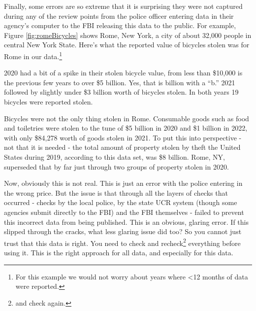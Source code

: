 \documentclass[
]{krantz}
\begin{document}
Finally, some errors are so extreme that it is surprising
they were not captured during any of the review points from
the police officer entering data in their agency's computer
to the FBI releasing this data to the public. For example,
Figure \ref{fig:romeBicycles} shows Rome, New York, a city
of about 32,000 people in central New York State. Here's
what the reported value of bicycles stolen was for Rome in
our data.\footnote{For this example we would not worry about
  years where \textless12 months of data were reported.}

2020 had a bit of a spike in their stolen bicycle value,
from less than \$10,000 is the previous few years to over
\$5 billion. Yes, that is billion with a ``b.'' 2021
followed by slightly under \$3 billion worth of bicycles
stolen. In both years 19 bicycles were reported stolen.

Bicycles were not the only thing stolen in Rome. Consumable
goods such as food and toiletries were stolen to the tune of
\$5 billion in 2020 and \$1 billion in 2022, with only
\$84,278 worth of goods stolen in 2021. To put this into
perspective - not that it is needed - the total amount of
property stolen by theft the United States during 2019,
according to this data set, was \$8 billion. Rome, NY,
superseded that by far just through two groups of property
stolen in 2020.

Now, obviously this is not real. This is just an error with
the police entering in the wrong price. But the issue is
that through all the layers of checks that occurred - checks
by the local police, by the state UCR system (though some
agencies submit directly to the FBI) and the FBI themselves
- failed to prevent this incorrect data from being
published. This is an obvious, glaring error. If this
slipped through the cracks, what less glaring issue did too?
So you cannot just trust that this data is right. You need
to check and recheck\footnote{and check again.} everything
before using it. This is the right approach for all data,
and especially for this data.
\end{document}
